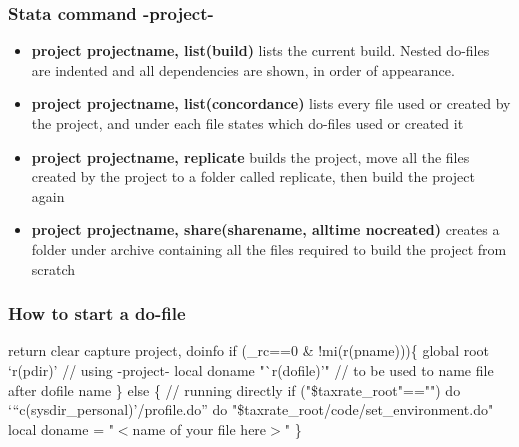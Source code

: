 \documentclass{beamer}
\begin{document}
\frame
{
	\frametitle{Stata command -project-}
	
	\begin{itemize}
		\item \textbf{project projectname, list(build)} lists the current build. Nested do-files are indented and all dependencies are shown, in order of appearance.
		\vspace{0.2cm}
		\item \textbf{project projectname, list(concordance)} lists every file used or created by the project, and under each file states which do-files used or created it
		\vspace{0.2cm}
		\item \textbf{project projectname, replicate} builds the project, move all the files created by the project to a folder called replicate, then build the project again
		\vspace{0.2cm}
		\item \textbf{project projectname, share(sharename, alltime nocreated)} creates a folder under archive containing all the files required to build the project from scratch
	\end{itemize}	
	
	
}
\frame
{
	\frametitle{How to start a do-file}
return clear \linebreak
capture project, doinfo \linebreak
if (\_rc==0 \& !mi(r(pname)))\{ \linebreak
\phantom{----} global root `r(pdir)' // using -project- \linebreak
\phantom{----} local doname "`r(dofile)'" // to be used to name file after dofile name \linebreak
\} \linebreak
else \{ // running directly \linebreak
\phantom{----}	if ("\${taxrate\_root}"=="") do `"`c(sysdir\_personal)'/profile.do"' \linebreak
\phantom{----}	do "\${taxrate\_root}/code/set\_environment.do" \linebreak
\phantom{----} local doname = "$<$name of your file here$>$" \linebreak
	\}


}
\end{document}
